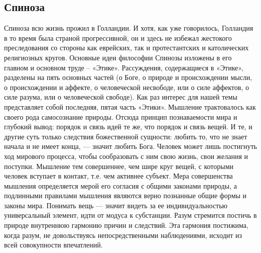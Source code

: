 \documentclass[12pt]{article}
\begin{document}
\subsection{Спиноза}
Спиноза всю жизнь прожил в Голландии. И хотя, как уже говорилось, Голландия в то время была страной
прогрессивной,  он  и  здесь  не  избежал  жестокого  преследования  со  стороны  как  еврейских,  так  и
протестантских и католических религиозных кругов.
Основные  идеи  философии  Спинозы  изложены  в  его  главном  и  основном  труде  –  «Этике».  Рассуждения,
содержащиеся в «Этике», разделены на пять основных частей (о Боге, о природе и происхождении мысли, о
происхождении  и  аффекте,  о  человеческой   несвободе,   или   о   силе   аффектов,  о  силе  разума,  или  о
человеческой свободе). Как раз интерес для нашей темы представляет собой последняя, пятая часть «Этики».
Мышление  трактовалось  как  своего  рода  самосознание  природы.  Отсюда  принцип  познаваемости  мира  и
глубокий вывод: порядок и связь идей те же, что порядок и связь вещей. И те, и другие суть только следствия
божественной сущности: любить то, что не знает начала и не имеет конца, — значит любить Бога. Человек
может  лишь  постигнуть  ход  мирового  процесса,  чтобы  сообразовать  с  ним  свою  жизнь,  свои  желания  и
поступки. Мышление тем совершеннее, чем шире круг вещей, с которыми человек вступает в контакт, т.е. чем
активнее субъект. Мера совершенства мышления определяется мерой его согласия с общими законами природы,
а подлинными правилами мышления являются верно познанные общие формы и законы мира. Понимать вещь
—  значит  видеть  за  ее  индивидуальностью  универсальный  элемент,  идти  от  модуса  к  субстанции.  Разум
стремится постичь в природе внутреннюю гармонию причин и следствий. Эта гармония постижима, когда
разум, не довольствуясь непосредственными наблюдениями, исходит из всей совокупности впечатлений.
\end{document}
